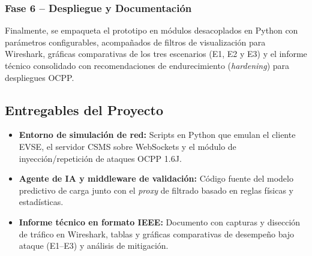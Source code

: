 \documentclass[conference]{IEEEtran}
\begin{document}
\subsubsection{Fase 6 -- Despliegue y Documentación}
Finalmente, se empaqueta el prototipo en módulos desacoplados en Python con parámetros configurables, acompañados de filtros de visualización para Wireshark, gráficas comparativas de los tres escenarios (E1, E2 y E3) y el informe técnico consolidado con recomendaciones de endurecimiento (\textit{hardening}) para despliegues OCPP.

\subsection{Entregables del Proyecto}

\begin{itemize}
    \item \textbf{Entorno de simulación de red:} Scripts en Python que emulan el cliente EVSE, el servidor CSMS sobre WebSockets y el módulo de inyección/repetición de ataques OCPP 1.6J.
    \item \textbf{Agente de IA y middleware de validación:} Código fuente del modelo predictivo de carga junto con el \textit{proxy} de filtrado basado en reglas físicas y estadísticas.
    \item \textbf{Informe técnico en formato IEEE:} Documento con capturas y disección de tráfico en Wireshark, tablas y gráficas comparativas de desempeño bajo ataque (E1--E3) y análisis de mitigación.
\end{itemize}
\end{document}
